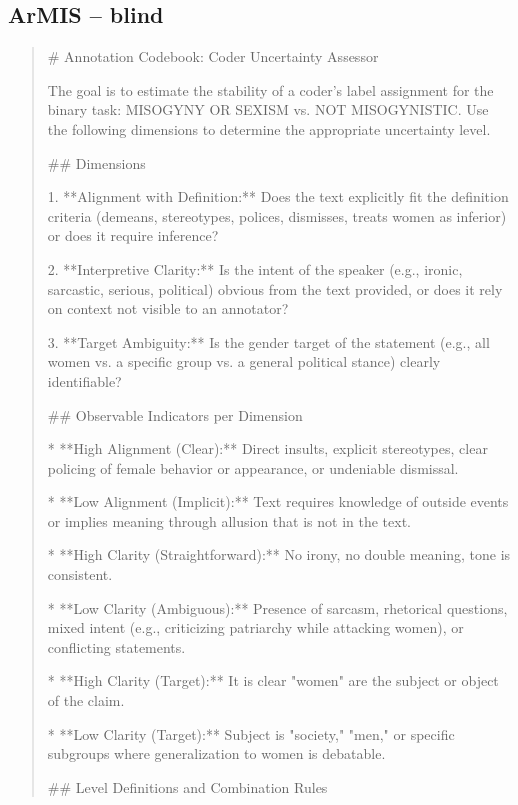 \subsection*{ArMIS -- blind}
\begin{quote}\small
# Annotation Codebook: Coder Uncertainty Assessor

The goal is to estimate the stability of a coder's label assignment for the binary task: MISOGYNY OR SEXISM vs. NOT MISOGYNISTIC. Use the following dimensions to determine the appropriate uncertainty level.



## Dimensions



1.  **Alignment with Definition:** Does the text explicitly fit the definition criteria (demeans, stereotypes, polices, dismisses, treats women as inferior) or does it require inference?

2.  **Interpretive Clarity:** Is the intent of the speaker (e.g., ironic, sarcastic, serious, political) obvious from the text provided, or does it rely on context not visible to an annotator?

3.  **Target Ambiguity:** Is the gender target of the statement (e.g., all women vs. a specific group vs. a general political stance) clearly identifiable?



## Observable Indicators per Dimension



*   **High Alignment (Clear):** Direct insults, explicit stereotypes, clear policing of female behavior or appearance, or undeniable dismissal.

*   **Low Alignment (Implicit):** Text requires knowledge of outside events or implies meaning through allusion that is not in the text.

*   **High Clarity (Straightforward):** No irony, no double meaning, tone is consistent.

*   **Low Clarity (Ambiguous):** Presence of sarcasm, rhetorical questions, mixed intent (e.g., criticizing patriarchy while attacking women), or conflicting statements.

*   **High Clarity (Target):** It is clear "women" are the subject or object of the claim.

*   **Low Clarity (Target):** Subject is "society," "men," or specific subgroups where generalization to women is debatable.



## Level Definitions and Combination Rules




\end{quote}
